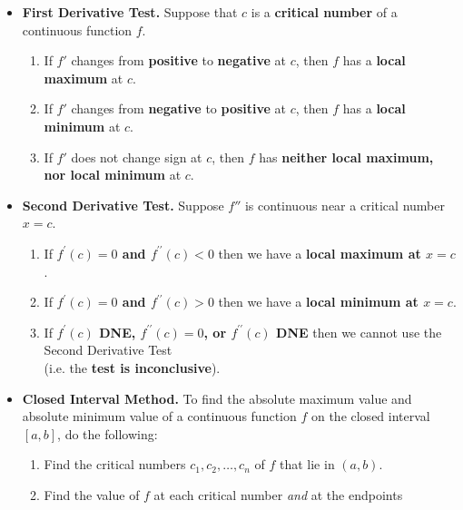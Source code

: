 \documentclass[11pt]{article}
\begin{document}
\begin{itemize}
\item\textbf{First Derivative Test.}
Suppose that $c$ is a
\textbf{critical number}
of a continuous function $f$.
\begin{enumerate}
\item
If $f'$ changes from
\textbf{positive}
to
\textbf{negative}
at $c$, then $f$ has a
\textbf{local maximum} at $c$.
\item
If $f'$ changes from
\textbf{negative}
to
\textbf{positive}
at $c$, then $f$ has a
\textbf{local minimum}
at $c$.
\item
If $f'$ does not change sign at $c$,
then $f$ has
\textbf{neither local maximum, nor local minimum}
at $c$.
\end{enumerate}
\vfill
\item\textbf{Second Derivative Test.}
Suppose $f''$ is continuous near a critical number $x=c$.
\begin{enumerate}
\item
If \textbf{$f^{\prime}(c)=0$ and $f^{\prime\prime}(c)<0$}
then we have a
\textbf{local maximum at $x=c$}.
\item
If \textbf{$f^{\prime}(c)=0$ and $f^{\prime\prime}(c)>0$}
then we have a
\textbf{local minimum at $x=c$}.
\item
If \textbf{$f^{\prime}(c)$ DNE,
$f^{\prime\prime}(c)=0$, or
$f^{\prime\prime}(c)$ DNE}
then we cannot use the Second Derivative Test\\
(i.e. the \textbf{test is inconclusive}).
\end{enumerate}
\vfill
\item
\textbf{Closed Interval Method.}
To find the absolute maximum value and absolute minimum value of a continuous function $f$ on the closed interval $[a, b]$, do the following:
\smallskip

\begin{minipage}{0.75\textwidth}
\begin{enumerate}
\item  Find the critical numbers $c_1, c_2, \ldots, c_n$ of $f$ that lie in $(a, b)$.
\item  Find the value of $f$ at each critical number {\em and} at the endpoints



\end{enumerate}
\end{minipage}
\end{itemize}
\end{document}
